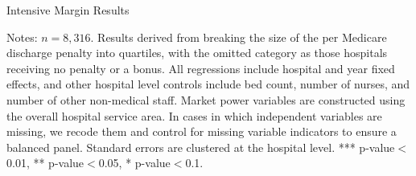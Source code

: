 \documentclass[12pt]{article}
\begin{document}
\newpage
{}
\setlength{\captionmargin}{.5 \textwidth} \addtolength{\captionmargin}{-.5\wd\gfxbox}
\begin{table}[htbp!]
\centering
\caption{Intensive Margin Results}
\label{tab:int}
\usebox{\gfxbox}
\par
\begin{minipage}{\wd\gfxbox}
\footnotesize
Notes: $n=8,316$.  Results derived from breaking the size of the per Medicare discharge penalty into quartiles, with the omitted category as those hospitals receiving no penalty or a bonus.  All regressions include hospital and year fixed effects, and other hospital level controls include bed count, number of nurses, and number of other non-medical staff.  Market power variables are constructed using the overall hospital service area.  In cases in which independent variables are missing, we recode them and control for missing variable indicators to ensure a balanced panel.  Standard errors are clustered at the hospital level.   *** p-value$<$0.01, ** p-value$<$0.05, * p-value$<$0.1.
\end{minipage}
\end{table}
\end{document}
